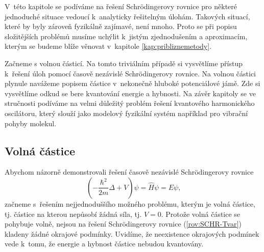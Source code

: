 V~této kapitole se podíváme na řešení Schrödingerovy rovnice pro některé jednoduché situace vedoucí k~analyticky řešitelným úlohám. Takových situací, které by byly zároveň fyzikálně zajímavé, není mnoho. Proto se při popisu složitějších problémů musíme uchýlit k~jistým zjednodušením a aproximacím, kterým se budeme blíže věnovat v~kapitole \ref{kap:pribliznemetody}.

Začneme s volnou částicí. Na tomto triviálním případě si vysvětlíme přístup k~řešení úloh pomocí časově nezávislé Schrödingerovy rovnice. Na volnou částici plynule navážeme popisem částice v~nekonečně hluboké potenciálové jámě. Zde si vysvětlíme odkud se bere kvantování energie a hybnosti. Na závěr kapitoly se ve stručnosti podíváme na velmi důležitý problém řešení kvantového harmonického oscilátoru, který slouží jako modelový fyzikální systém například pro vibrační pohyby molekul.

\subsection{Volná částice}
\label{kap:VolnaCastice}

Abychom názorně demonstrovali řešení časově nezávislé Schrödingerovy rovnice
\begin{equation}
(- \frac{\hbar^2}{2m} \Delta + V) \psi = \hat{H} \psi = E \psi \mbox{,}
\label{rov:SCHR-Tvar}
\end{equation}
začneme s~řešením nejjednoduššího možného problému, kterým je volná částice, tj. částice na kterou nepůsobí žádná síla, tj. $V = 0$. Protože volná částice se pohybuje volně, nejsou na řešení Schrödingerovy rovnice (\ref{rov:SCHR-Tvar}) kladeny žádné okrajové podmínky. Uvidíme, že neexistence okrajových podmínek vede k~tomu, že energie a hybnost částice nebudou kvantovány.

